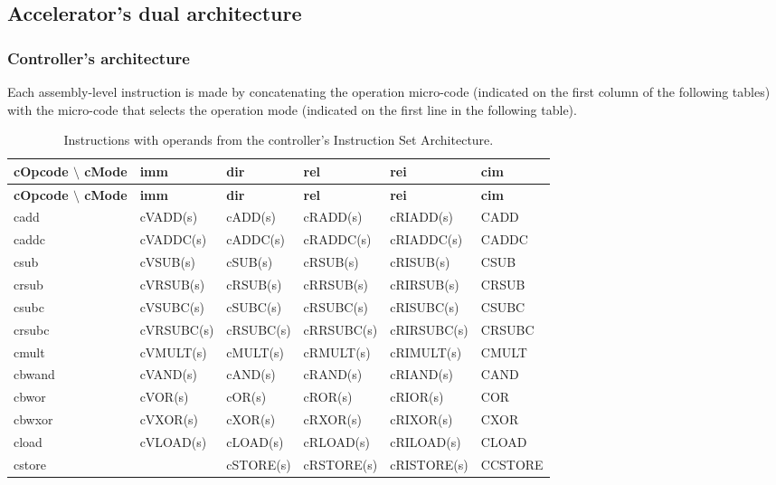 \subsection{Accelerator's dual architecture}

\subsubsection{Controller's architecture}

Each assembly-level instruction is made by concatenating the operation micro-code (indicated on the first column of the following tables) with the micro-code that selects the operation mode (indicated on the first line in the following table).


\begin{table}[H]
\small
\centering
\begin{longtable}{|l||l|l|l|l|l|}
\caption{Instructions with operands from the controller's Instruction Set Architecture.}
\label{tab:controller_isa} \\
\hline
\textbf{cOpcode $\setminus$ cMode} & \textbf{imm} & \textbf{dir} & \textbf{rel} & \textbf{rei} & \textbf{cim} \\
\hline
\endfirsthead
\hline
\textbf{cOpcode $\setminus$ cMode} & \textbf{imm} & \textbf{dir} & \textbf{rel} & \textbf{rei} & \textbf{cim} \\
\hline
\endhead
\hline
\endfoot
\hline
\endlastfoot
cadd      & cVADD(s)    & cADD(s)    & cRADD(s)    & cRIADD(s)    & CADD       \\ \hline
caddc     & cVADDC(s)   & cADDC(s)   & cRADDC(s)   & cRIADDC(s)   & CADDC      \\ \hline
csub      & cVSUB(s)    & cSUB(s)    & cRSUB(s)    & cRISUB(s)    & CSUB       \\ \hline
crsub     & cVRSUB(s)   & cRSUB(s)   & cRRSUB(s)   & cRIRSUB(s)   & CRSUB      \\ \hline
csubc     & cVSUBC(s)   & cSUBC(s)   & cRSUBC(s)   & cRISUBC(s)   & CSUBC      \\ \hline
crsubc    & cVRSUBC(s)  & cRSUBC(s)  & cRRSUBC(s)  & cRIRSUBC(s)  & CRSUBC     \\ \hline
cmult     & cVMULT(s)   & cMULT(s)   & cRMULT(s)   & cRIMULT(s)   & CMULT      \\ \hline
cbwand    & cVAND(s)    & cAND(s)    & cRAND(s)    & cRIAND(s)    & CAND       \\ \hline
cbwor     & cVOR(s)     & cOR(s)     & cROR(s)     & cRIOR(s)     & COR        \\ \hline
cbwxor    & cVXOR(s)    & cXOR(s)    & cRXOR(s)    & cRIXOR(s)    & CXOR       \\ \hline
cload     & cVLOAD(s)   & cLOAD(s)   & cRLOAD(s)   & cRILOAD(s)   & CLOAD      \\ \hline
cstore    &             & cSTORE(s)  & cRSTORE(s)  & cRISTORE(s)  & CCSTORE    \\ \hline
\end{longtable}
\end{table}




